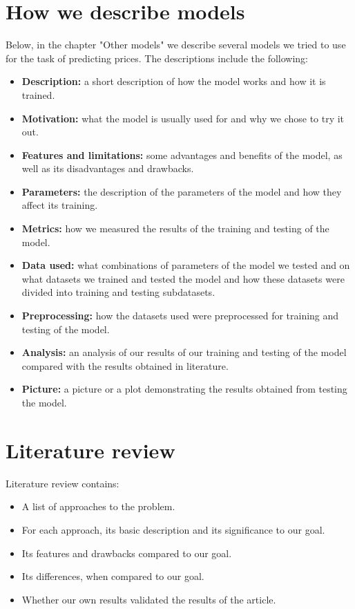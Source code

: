\section{How we describe models}
Below, in the chapter "Other models" we describe several models we tried to use for the task of predicting prices. The descriptions include the following:
\begin{itemize}
	\item \textbf{Description:} a short description of how the model works and how it is trained.
	\item \textbf{Motivation:} what the model is usually used for and why we chose to try it out.
	\item \textbf{Features and limitations:} some advantages and benefits of the model, as well as its disadvantages and drawbacks.
	\item \textbf{Parameters:} the description of the parameters of the model and how they affect its training.
	\item \textbf{Metrics:} how we measured the results of the training and testing of the model.
	\item \textbf{Data used:} what combinations of parameters of the model we tested and on what datasets we trained and tested the model and how these datasets were divided into training and testing subdatasets.
	\item \textbf{Preprocessing:} how the datasets used were preprocessed for training and testing of the model.
	\item \textbf{Analysis:} an analysis of our results of our training and testing of the model compared with the results obtained in literature.
	\item \textbf{Picture:} a picture or a plot demonstrating the results obtained from testing the model.
\end{itemize}

\section{Literature review}
Literature review contains:
\begin{itemize}
	\item A list of approaches to the problem.
	\item For each approach, its basic description and its significance to our goal.
	\item Its features and drawbacks compared to our goal.
	\item Its differences, when compared to our goal.
	\item Whether our own results validated the results of the article.
\end{itemize}

